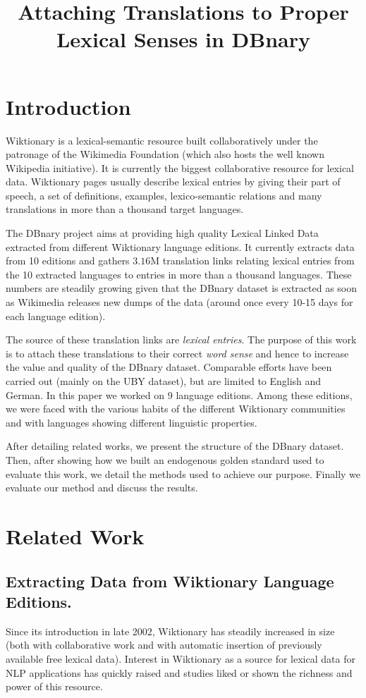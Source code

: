 \documentclass[10pt, a4paper]{article}
\title{Attaching Translations to Proper Lexical Senses in DBnary}
\begin{document}
\maketitleabstract

\section{Introduction}

 Wiktionary is a lexical-semantic resource built collaboratively under the patronage of the Wikimedia Foundation (which also hosts the well known Wikipedia initiative). It is currently the biggest collaborative resource for lexical data. Wiktionary pages usually describe lexical entries by giving their part of speech, a set of definitions, examples, lexico-semantic relations and many translations in more than a thousand target languages.

The DBnary project \cite{serasset:dbnary-swj} aims at providing high quality Lexical Linked Data extracted from different Wiktionary language editions. It currently extracts data from 10 editions and gathers $3.16$M translation links relating lexical entries from the 10 extracted languages to entries in more than a thousand languages. These numbers are steadily growing given that the DBnary dataset is extracted as soon as Wikimedia releases new dumps of the data (around once every 10-15 days for each language edition).

The source of these translation links are \emph{lexical entries}. The purpose of this work is to attach these translations to their correct \emph{word sense} and hence to increase the value and quality of the DBnary dataset. Comparable efforts have been carried out (mainly on the UBY dataset), but are limited to English and German. In this paper we worked on 9 language editions. Among these editions, we were faced with the various habits of the different Wiktionary communities and with languages showing different linguistic properties. 

After detailing related works, we present the structure of the DBnary dataset. Then, after showing how we built an endogenous golden standard used to evaluate this work, we detail the methods used to achieve our purpose. Finally we evaluate our method and discuss the results.

\section{Related Work}

\subsection{Extracting Data from Wiktionary Language Editions.} Since its introduction in late 2002, Wiktionary has steadily increased in size (both with collaborative work and with automatic insertion of previously available free lexical data). Interest in Wiktionary as a source for lexical data for NLP applications has quickly raised and studies liked \cite{Zesch:AAAI2008} or \cite{navarro-EtAl:2009:PeoplesWeb} shown the richness and power of this resource. 
\end{document}

